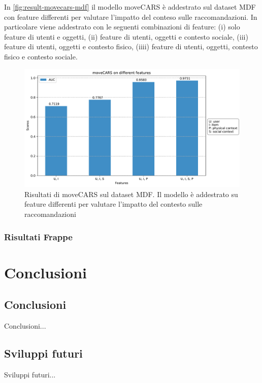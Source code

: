 \documentclass[12pt,italian]{report}
\begin{document}
In \autoref{fig:result-movecars-mdf} il modello moveCARS è addestrato sul dataset MDF con feature differenti per valutare l'impatto del conteso sulle raccomandazioni. In particolare viene addestrato con le seguenti combinazioni di feature: (i) solo feature di utenti e oggetti, (ii) feature di utenti, oggetti e contesto sociale, (iii) feature di utenti, oggetti e contesto fisico, (iiii) feature di utenti, oggetti, contesto fisico e contesto sociale. 

\begin{figure}
  \centering
  \includegraphics[width=\linewidth]{immagini/moveCARS_diff_features.pdf}
  \caption{Risultati di moveCARS sul dataset MDF. Il modello è addestrato su feature differenti per valutare l'impatto del contesto sulle raccomandazioni}
  \label{fig:result-movecars-mdf}
\end{figure}





\subsection{Risultati Frappe}

% 
% 

\chapter{Conclusioni} \label{chap:conclusioni}

\section{Conclusioni}

Conclusioni...

\section{Sviluppi futuri}

Sviluppi futuri...



%
%



\end{document}
